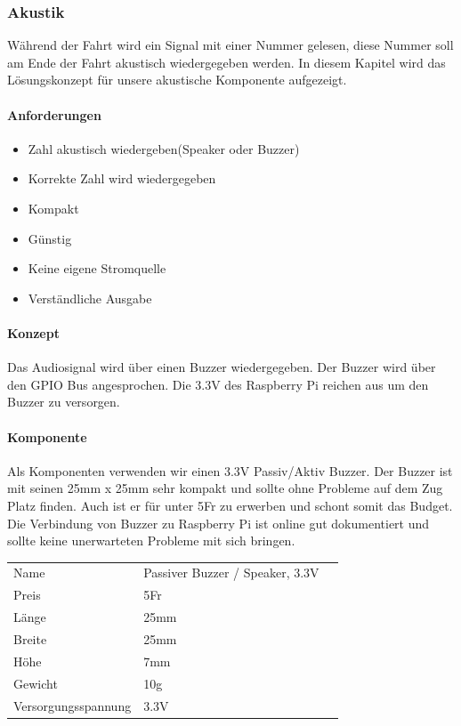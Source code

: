 \documentclass[../../main.tex]{subfiles}
\begin{document}
\subsubsection{Akustik}
Während der Fahrt wird ein Signal mit einer Nummer gelesen, diese Nummer soll am Ende der Fahrt akustisch wiedergegeben werden. In diesem Kapitel wird das Lösungskonzept für unsere akustische Komponente aufgezeigt.

\paragraph{Anforderungen}
\begin{itemize}
    \item Zahl akustisch wiedergeben(Speaker oder Buzzer)
    \item Korrekte Zahl wird wiedergegeben
    \item Kompakt
    \item Günstig
    \item Keine eigene Stromquelle
    \item Verständliche Ausgabe
\end{itemize}

\paragraph{Konzept}
Das Audiosignal wird über einen Buzzer wiedergegeben. Der Buzzer wird über den GPIO Bus angesprochen. Die 3.3V des Raspberry Pi reichen aus um den Buzzer zu versorgen.

\paragraph{Komponente}
Als Komponenten verwenden wir einen 3.3V Passiv/Aktiv Buzzer. Der Buzzer ist mit seinen 25mm x 25mm sehr kompakt und sollte ohne Probleme auf dem Zug Platz finden. Auch ist er für unter 5Fr zu erwerben und schont somit das Budget. Die Verbindung von Buzzer zu Raspberry Pi ist online gut dokumentiert und sollte keine unerwarteten Probleme mit sich bringen.

\begin{table}[H]
\begin{flushleft}
\begin{tabular}{lll}
Name & Passiver Buzzer / Speaker, 3.3V \\
Preis & 5Fr    \\
Länge & 25mm    \\
Breite & 25mm   \\
Höhe & 7mm      \\
Gewicht & 10g   \\
Versorgungsspannung & 3.3V \\
\end{tabular}
\end{flushleft}
\end{table}
\end{document}
